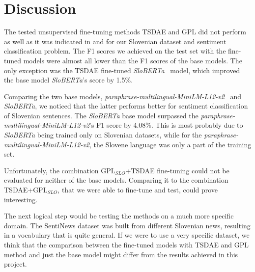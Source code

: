 \documentclass[fleqn,moreauthors,10pt]{ds_report}
\begin{document}



\section*{Discussion}




The tested unsupervised fine-tuning methods TSDAE and GPL did not perform as well as it was indicated in \cite{wang-etal-2021-tsdae-using} and \cite{GPL} for our Slovenian dataset and sentiment classification problem. The F1 scores we achieved on the test set with the fine-tuned models were almost all lower than the F1 scores of the base models. The only exception was the TSDAE fine-tuned {\it SloBERTa}~\cite{sloberta} model, which improved the base model {\it SloBERTa}'s score by 1.5\%.

Comparing the two base models, {\it paraphrase-multilingual-MiniLM-L12-v2}~\cite{reimers-2019-sentence-bert} and {\it SloBERTa}, we noticed that the latter performs better for sentiment classification of Slovenian sentences. The {\it SloBERTa} base model surpassed the {\it paraphrase-multilingual-MiniLM-L12-v2}'s F1 score by 4.08\%. This is most probably due to {\it SloBERTa} being trained only on Slovenian datasets, while for the {\it paraphrase-multilingual-MiniLM-L12-v2}, the Slovene language was only a part of the training set.

Unfortunately, the combination $\text{GPL}_{SLO}$+TSDAE fine-tuning could not be evaluated for neither of the base models. Comparing it to the combination TSDAE+$\text{GPL}_{SLO}$, that we were able to fine-tune and test, could prove interesting.

The next logical step would be testing the methods on a much more specific domain. The SentiNews dataset was built from different Slovenian news, resulting in a vocabulary that is quite general. If we were to use a very specific dataset, we think that the comparison between the fine-tuned models with TSDAE and GPL method and just the base model might differ from the results achieved in this project.
\end{document}
